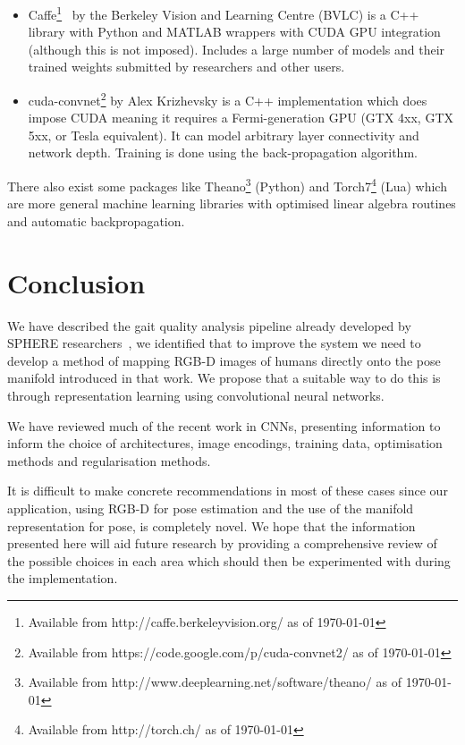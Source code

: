 \documentclass[11pt]{article} %
\begin{document}
\begin{itemize}

\item{Caffe\footnote{Available from http://caffe.berkeleyvision.org/ as of \today}~\cite{Jia2014} by the Berkeley Vision and Learning Centre (BVLC) is a C++ library with Python and MATLAB wrappers with CUDA GPU integration (although this is not imposed). Includes a large number of models and their trained weights submitted by researchers and other users.}

\item{cuda-convnet\footnote{Available from https://code.google.com/p/cuda-convnet2/ as of \today} by Alex Krizhevsky is a C++ implementation which does impose CUDA meaning it requires a Fermi-generation GPU (GTX 4xx, GTX 5xx, or Tesla equivalent).  It can model arbitrary layer connectivity and network depth. Training is done using the back-propagation algorithm.}

\end{itemize}
There also exist some packages like Theano\footnote{Available from http://www.deeplearning.net/software/theano/ as of \today} (Python) and Torch7\footnote{Available from http://torch.ch/ as of \today} (Lua) which are more general machine learning libraries with optimised linear algebra routines and automatic backpropagation.

\section{Conclusion}
We have described the gait quality analysis pipeline already developed by SPHERE researchers~\cite{Paiement}, we identified that to improve the system we need to develop a method of mapping RGB-D images of humans directly onto the pose manifold introduced in that work. We propose that a suitable way to do this is through representation learning using convolutional neural networks. 

We have reviewed much of the recent work in CNNs, presenting information to inform the choice of architectures, image encodings, training data, optimisation methods and regularisation methods. 

It is difficult to make concrete recommendations in most of these cases since our application, using RGB-D for pose estimation and the use of the manifold representation for pose, is completely novel. We hope that the information presented here will aid future research by providing a comprehensive review of the possible choices in each area which should then be experimented with during the implementation.



\end{document}
